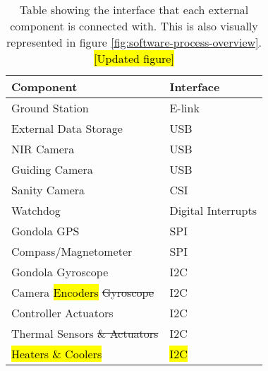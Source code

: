 \begin{table}[H]
	\centering
	\begin{tabular}{l|l}
		\textbf{Component}
		& \textbf{Interface} \\ \hline
		Ground Station
		& E-link             \\
		External Data Storage
		& USB            	 \\
		NIR Camera
		& USB                \\
		Guiding Camera
		& USB                \\
		Sanity Camera
		& CSI                \\
		Watchdog
		& Digital Interrupts \\
		Gondola GPS
		& SPI                \\
		Compass/Magnetometer
		& SPI                \\
		Gondola Gyroscope
		& I2C                \\
		Camera \hl{Encoders} \st{Gyroscope}
		& I2C                \\
		Controller Actuators
		& I2C                \\
		Thermal Sensors \st{\& Actuators}
		& I2C				 \\
		\hl{Heaters \& Coolers}
		& \hl{I2C}
	\end{tabular}
	\caption{Table showing the interface that each external component is connected with. This is also visually represented in figure \ref{fig:software-process-overview}. \hl{[Updated figure]}}
	\label{tab:software-interfaces}
\end{table}
